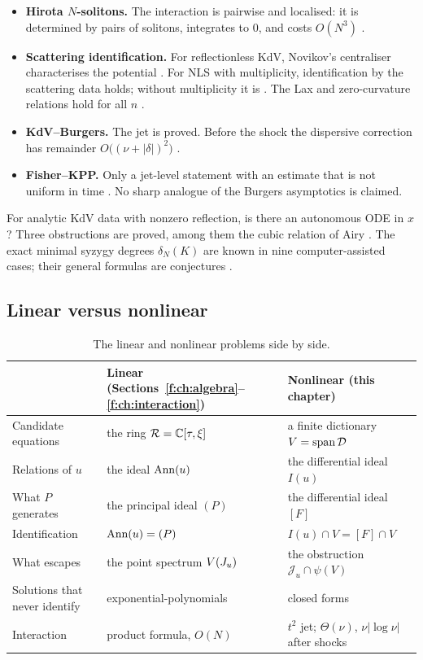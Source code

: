 \begin{itemize}
\item \textbf{Hirota $N$-solitons.} The interaction is pairwise and localised: it is determined by pairs of solitons, integrates to $0$, and costs $O(N^3)$  \proved.
\item \textbf{Scattering identification.} For reflectionless KdV, Novikov's centraliser characterises the potential  \proved. For NLS with multiplicity, identification by the scattering data holds; without multiplicity it is \falsest. The Lax and zero-curvature relations hold for all $n$  \proved.
\item \textbf{KdV--Burgers.} The jet is proved. Before the shock the dispersive correction has remainder $O\big((\nu+|\delta|)^2\big)$  .
\item \textbf{Fisher--KPP.} Only a jet-level statement with an estimate that is not uniform in time  \proved. No sharp analogue of the Burgers asymptotics is claimed.
\end{itemize}

\begin{caution}[title={Open in the nonlinear part}]
For analytic KdV data with nonzero reflection, is there an autonomous ODE in $x$? Three obstructions are proved, among them the cubic relation of Airy \openq{} . The exact minimal syzygy degrees $\delta_N(K)$ are known in nine computer-assisted cases; their general formulas are conjectures \openq{} .
\end{caution}

\subsection{Linear versus nonlinear}

\begin{table}[!htb]
\centering\small
\begin{tabular}{@{}L{3.0cm}L{5.8cm}L{5.8cm}@{}}
\toprule
 & Linear (Sections~\ref{f:ch:algebra}--\ref{f:ch:interaction}) & Nonlinear (this chapter)\\\midrule
Candidate equations & the ring $\mathcal{R}=\mathbb{C}[\tau,\xi]$ & a finite dictionary $V=\operatorname{span}\mathcal D$\\
Relations of $u$ & the ideal $\operatorname{Ann}(u)$ & the differential ideal $I(u)$\\
What $P$ generates & the principal ideal $(P)$ & the differential ideal $[F]$\\
Identification & $\operatorname{Ann}(u)=(P)$ & $I(u)\cap V=[F]\cap V$\\
What escapes & the point spectrum $V(J_u)$ & the obstruction $\mathcal J_u\cap\psi(V)$\\
Solutions that never identify & exponential-polynomials & closed forms\\
Interaction & product formula, $O(N)$ & $t^2$ jet; $\Theta(\nu)$, $\nu|\log\nu|$ after shocks\\
\bottomrule
\end{tabular}
\caption{The linear and nonlinear problems side by side.}\label{f:tab:lin-nonlin}
\end{table}

